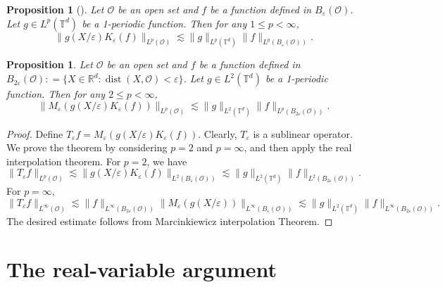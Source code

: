 \documentclass[reqno,12pt]{amsart} %
\newtheorem{proposition}[theorem]{Proposition}
\theoremstyle{definition}
\theoremstyle{remark}
\numberwithin{equation}{section}
\newcommand{\R}{\mathbb{R}}
\newcommand{\T}{\mathbb{T}}
\newcommand{\e}{\varepsilon}
\DeclareMathOperator{\dist}{dist}
\begin{document}
\begin{proposition}[{\cite[Proposition 3.1.5]{ShenBook}}]
    Let $\mathcal{O}$ be an open set and  $f$ be a function defined in $B_{\e}(\mathcal{O})$. Let $g \in L^p(\T^d)$ be a 1-periodic function. Then for any $1 \le p < \infty$,
    \begin{equation}
        \| g(X/\e) K_\e (f)  \|_{L^p(\mathcal{O})} \lesssim \| g \|_{L^p(\T^d)} \| f \|_{L^p(B_{\e}(\mathcal{O}))}.
    \end{equation}
\end{proposition}

\begin{proposition}\label{prop.Me(gKef)}
    Let $\mathcal{O}$ be an open set and  $f$ be a function defined in $B_{2\e}(\mathcal{O}): = \{ X\in \R^d: \dist(X,\mathcal{O}) < \e \}$. Let $g \in L^2(\T^d)$ be a 1-periodic function. Then for any $2\le p < \infty$,
    \begin{equation}
        \| M_\e(g(X/\e) K_\e (f) ) \|_{L^p(\mathcal{O})} \lesssim \| g \|_{L^2(\T^d)} \| f \|_{L^p(B_{2\e}(\mathcal{O}))}.
    \end{equation}
\end{proposition}
\begin{proof}
    Define $T_\e f = M_\e(g(X/\e) K_\e (f) )$. Clearly, $T_\e$ is a sublinear operator. We prove the theorem by considering $p = 2$ and $p = \infty$, and then apply the real interpolation theorem.
    For $p  = 2$, we have
    \begin{equation}
        \| T_\e f \|_{L^p(\mathcal{O})} \lesssim \| g(X/\e) K_\e (f) \|_{L^2(B_\e(\mathcal{O}))} \lesssim \| g \|_{L^2(\T^d)} \| f \|_{L^2(B_{2\e}(\mathcal{O}))}.
    \end{equation}
    For $p = \infty$, 
    \begin{equation}
        \| T_\e f \|_{L^\infty(\mathcal{O})} \lesssim \| f \|_{L^\infty(B_{2\e}(\mathcal{O}))} \| M_\e(g(X/\e)) \|_{L^\infty(B_{\e}(\mathcal{O}))} \lesssim \| g \|_{L^2(\T^d)} \| f \|_{L^\infty(B_{2\e}(\mathcal{O}))}.
    \end{equation}
    The desired estimate follows from Marcinkiewicz interpolation Theorem.
\end{proof}

\section{The real-variable argument}
\end{document}
